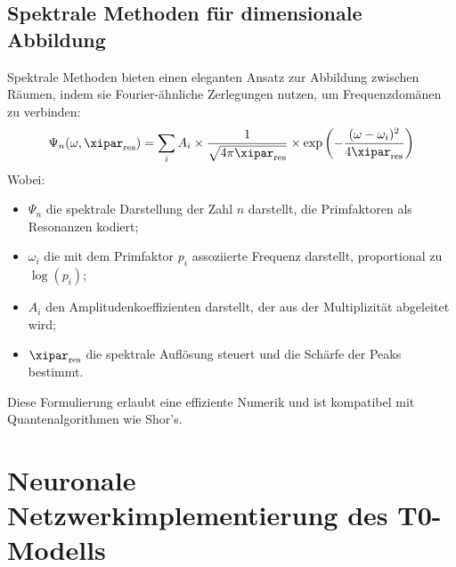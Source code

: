 \subsection{Spektrale Methoden für dimensionale Abbildung}
\label{subsec:spectral_methods}
Spektrale Methoden bieten einen eleganten Ansatz zur Abbildung zwischen Räumen, indem sie Fourier-ähnliche Zerlegungen nutzen, um Frequenzdomänen zu verbinden:
\begin{equation}
	\Psi_n(\omega, \xipar_{\text{res}}) = \sum_i A_i \times \frac{1}{\sqrt{4\pi\xipar_{\text{res}}}} \times \exp\left(-\frac{(\omega-\omega_i)^2}{4\xipar_{\text{res}}}\right)
\end{equation}
Wobei:
\begin{itemize}
	\item $\Psi_n$ die spektrale Darstellung der Zahl $n$ darstellt, die Primfaktoren als Resonanzen kodiert;
	\item $\omega_i$ die mit dem Primfaktor $p_i$ assoziierte Frequenz darstellt, proportional zu $\log(p_i)$;
	\item $A_i$ den Amplitudenkoeffizienten darstellt, der aus der Multiplizität abgeleitet wird;
	\item $\xipar_{\text{res}}$ die spektrale Auflösung steuert und die Schärfe der Peaks bestimmt.
\end{itemize}
Diese Formulierung erlaubt eine effiziente Numerik und ist kompatibel mit Quantenalgorithmen wie Shor's.
\section{Neuronale Netzwerkimplementierung des T0-Modells}
\label{sec:neural_network}
